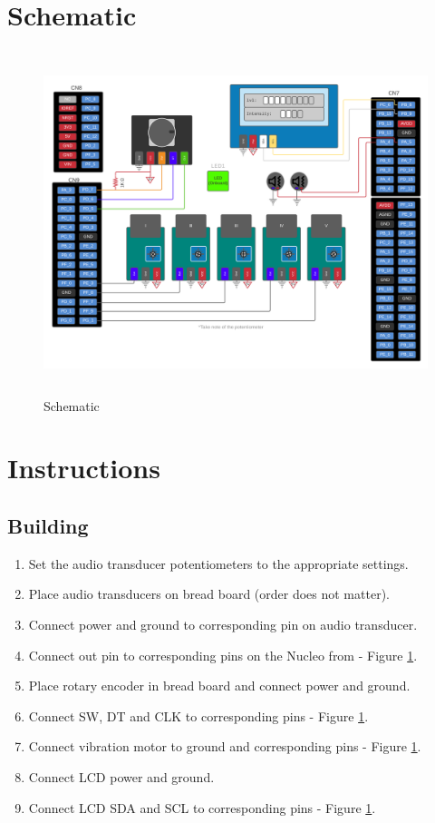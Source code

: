 \documentclass{article}
\begin{document}
\newpage
\section{Schematic}
    \begin{figure}[h!]
        \begin{center}
            \includegraphics[height=10cm]{graphics/Schematic.png}
        \end{center}
        \caption{Schematic}
        \label{fig:Schematic}
    \end{figure}

\section{Instructions}
\subsection{Building}
\begin{enumerate}
    \item Set the audio transducer potentiometers to the appropriate settings.
    \item Place audio transducers on bread board (order does not matter).
    \item Connect power and ground to corresponding pin on audio transducer.
    \item Connect out pin to corresponding pins on the Nucleo from - Figure \ref{fig:Schematic}.
    \item Place rotary encoder in bread board and connect power and ground.
    \item Connect SW, DT and CLK to corresponding pins - Figure \ref{fig:Schematic}.
    \item Connect vibration motor to ground and corresponding pins - Figure \ref{fig:Schematic}.
    \item Connect LCD power and ground.
    \item Connect LCD SDA and SCL to corresponding pins - Figure \ref{fig:Schematic}.
\end{enumerate}
\end{document}
